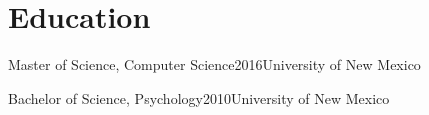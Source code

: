 \documentclass[print]{friggeri-cv} %
\begin{document}
\iftoggle{cv}{
  \begin{description}
    \item  {\largeheaderfont Student Volunteer } \smallheaderfont{\hfill 2008\textemdash 2010} \\*
          {\footnotesize \emph{The Mind Research Network, Albuquerque, NM}} \hfill \\*
          Assisted with a study ran by Pilar Sanjuan, PhD investigating substance use
          and post-traumatic stress disorder (PTSD) in recently returned combat
          veterans. \\*
  \end{description}


  \begin{description}
    \item  \largeheaderfont{Student Volunteer}  \hfill {\smallheaderfont 2008 } \\*
          {\footnotesize \emph{The University of New Mexico, Albuquerque, NM}\textemdash } \\*
          Assisted Akaysha Tang, PhD, with a study investigating stress regulation in
          rats and assisted an expert in troubleshooting and repairing an EEG system
          for a study investigating stress in humans.\\*
  \end{description}
}{} %

\section{Education}
\begin{edu}{Master of Science, Computer Science}{2016}{University of New Mexico}
\end{edu}
\begin{edu}{Bachelor of Science, Psychology}{2010}{University of New Mexico}
\end{edu}
\end{document}
